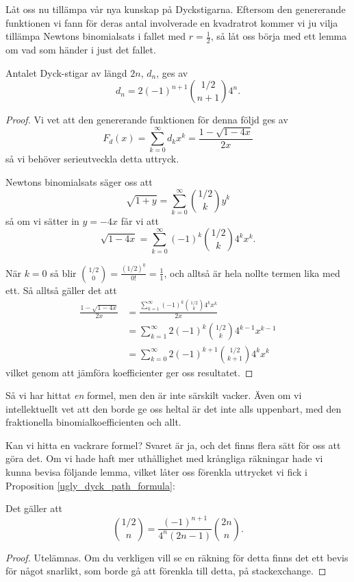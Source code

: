 \documentclass{tufte-handout}
\begin{document}
Låt oss nu tillämpa vår nya kunskap på Dyckstigarna. Eftersom den genererande funktionen vi fann för deras antal involverade en kvadratrot kommer vi ju vilja tillämpa Newtons binomialsats i fallet med $r = \frac{1}{2}$, så låt oss börja med ett lemma om vad som händer i just det fallet.

\begin{proposition}\label{ugly_dyck_path_formula}
    Antalet Dyck-stigar av längd $2n$, $d_n$, ges av
    $$d_n = 2 (-1)^{n+1}\binom{1/2}{n+1} 4^n.$$

    \begin{proof}
        Vi vet att den genererande funktionen för denna följd ges av
        $$F_d(x) = \sum_{k=0}^{\infty} d_k x^k = \frac{1 - \sqrt{1 - 4x}}{2x}$$
        så vi behöver serieutveckla detta uttryck.

        Newtons binomialsats säger oss att
        $$\sqrt{1 + y} = \sum_{k=0}^{\infty} \binom{1/2}{k} y^k$$
        så om vi sätter in $y = -4x$ får vi att
        $$\sqrt{1 - 4x} = \sum_{k=0}^{\infty} (-1)^k \binom{1/2}{k} 4^k x^k.$$
        
        När $k=0$ så blir $\binom{1/2}{0} = \frac{(1/2)^{\underline{0}}}{0!} = \frac{1}{1}$, och alltså är hela nollte termen lika med ett. Så alltså gäller det att
        \begin{align*}
            \frac{1 - \sqrt{1 - 4x}}{2x} &= \frac{\sum_{k=1}^{\infty} (-1)^k \binom{1/2}{k} 4^k x^k}{2x}\\
            &= \sum_{k=1}^{\infty} 2(-1)^k \binom{1/2}{k} 4^{k-1} x^{k-1}\\
            &= \sum_{k=0}^{\infty} 2 (-1)^{k+1}\binom{1/2}{k+1} 4^k x^k
        \end{align*}
        vilket genom att jämföra koefficienter ger oss resultatet.
    \end{proof}
\end{proposition}

Så vi har hittat \emph{en} formel, men den är inte särskilt vacker. Även om vi intellektuellt vet att den borde ge oss heltal är det inte alls uppenbart, med den fraktionella binomialkoefficienten och allt.

Kan vi hitta en vackrare formel? Svaret är ja, och det finns flera sätt för oss att göra det. Om vi hade haft mer uthållighet med krångliga räkningar hade vi kunna bevisa följande lemma, vilket låter oss förenkla uttrycket vi fick i Proposition \ref{ugly_dyck_path_formula}:

\begin{lemma}\label{lemma_onehalf_binom_coeff}
    Det gäller att
    $$\binom{1/2}{n} = \frac{(-1)^{n+1}}{4^n(2n-1)}\binom{2n}{n}.$$
    \begin{proof}
        Utelämnas. Om du verkligen vill se en räkning för detta finns det ett bevis för något snarlikt, som borde gå att förenkla till detta, på stackexchange.\cite{dyck_path_stackexchange}
    \end{proof}
\end{lemma}
\end{document}
